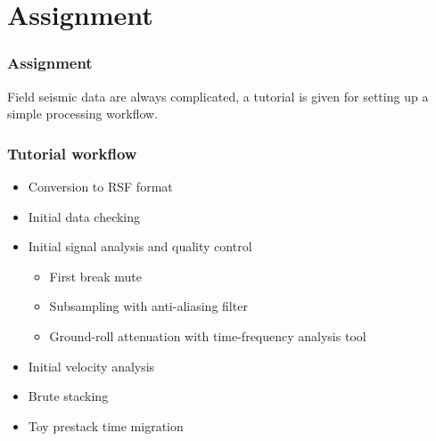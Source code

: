\section{Assignment}

\begin{frame}
  \frametitle{Assignment}
    \begin{block}{}
Field seismic data are always complicated,
a tutorial is given for setting up a
simple processing workflow.
    \end{block}
\end{frame}

\begin{frame}
  \frametitle{Tutorial workflow}

  \begin{itemize}
  \item Conversion to RSF format
  \item Initial data checking
  \item Initial signal analysis and quality control
     \begin{itemize}
       \item First break mute
       \item Subsampling with anti-aliasing filter
       \item Ground-roll attenuation with time-frequency analysis tool
     \end{itemize}
   \item Initial velocity analysis
   \item Brute stacking
   \item Toy prestack time migration
  \end{itemize}
\end{frame}

